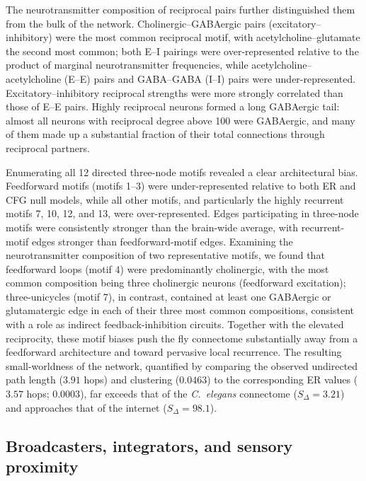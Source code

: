 \documentclass[11pt]{article}
\begin{document}
The neurotransmitter composition of reciprocal pairs further distinguished
them from the bulk of the network. Cholinergic--GABAergic pairs
(excitatory--inhibitory) were the most common reciprocal motif, with
acetylcholine--glutamate the second most common; both E--I pairings were
over-represented relative to the product of marginal neurotransmitter
frequencies, while acetylcholine--acetylcholine (E--E) pairs and
GABA--GABA (I--I) pairs were under-represented. Excitatory--inhibitory
reciprocal strengths were more strongly correlated than those of E--E
pairs. Highly reciprocal neurons formed a long GABAergic tail: almost all
neurons with reciprocal degree above 100 were GABAergic, and many of them
made up a substantial fraction of their total connections through
reciprocal partners.

Enumerating all 12 directed three-node motifs revealed a clear
architectural bias. Feedforward motifs (motifs 1--3) were under-represented
relative to both ER and CFG null models, while all other motifs, and
particularly the highly recurrent motifs 7, 10, 12, and 13, were
over-represented. Edges participating in three-node motifs were
consistently stronger than the brain-wide average, with recurrent-motif
edges stronger than feedforward-motif edges. Examining the
neurotransmitter composition of two representative motifs, we found that
feedforward loops (motif 4) were predominantly cholinergic, with the most
common composition being three cholinergic neurons (feedforward
excitation); three-unicycles (motif 7), in contrast, contained at least
one GABAergic or glutamatergic edge in each of their three most common
compositions, consistent with a role as indirect feedback-inhibition
circuits. Together with the elevated reciprocity, these motif biases push
the fly connectome substantially away from a feedforward architecture and
toward pervasive local recurrence. The resulting small-worldness of the
network, quantified by comparing the observed undirected path length
($3.91$ hops) and clustering ($0.0463$) to the corresponding ER values
($3.57$ hops; $0.0003$), far exceeds that of the \textit{C.\ elegans}
connectome ($S_\Delta = 3.21$) and approaches that of the
internet ($S_\Delta = 98.1$).

\subsection{Broadcasters, integrators, and sensory proximity}
\end{document}
